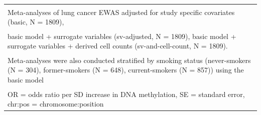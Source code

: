 \documentclass[11pt,oneside]{bristolthesis}
\begin{document}
\begin{landscape}
\begin{table}[!h]
{\begin{tabular}[t]{lllllllllllllllllllll}
\bottomrule
\multicolumn{21}{l}{\textsuperscript{} Meta-analyses of lung cancer EWAS adjusted for study specific covariates (basic, N = 1809),}\\
\multicolumn{21}{l}{\textsuperscript{} basic model + surrogate variables (sv-adjusted, N = 1809), basic model + surrogate variables + derived cell counts (sv-and-cell-count, N = 1809).}\\
\multicolumn{21}{l}{\textsuperscript{} Meta-analyses were also conducted stratified by smoking status (never-smokers (N = 304), former-smokers (N = 648), current-smokers (N = 857)) using the basic model}\\
\multicolumn{21}{l}{\textsuperscript{} OR = odds ratio per SD increase in DNA methylation, SE = standard error, chr:pos = chromosome:position}\\
\end{tabular}}
\end{table}
\end{landscape}
\end{document}
